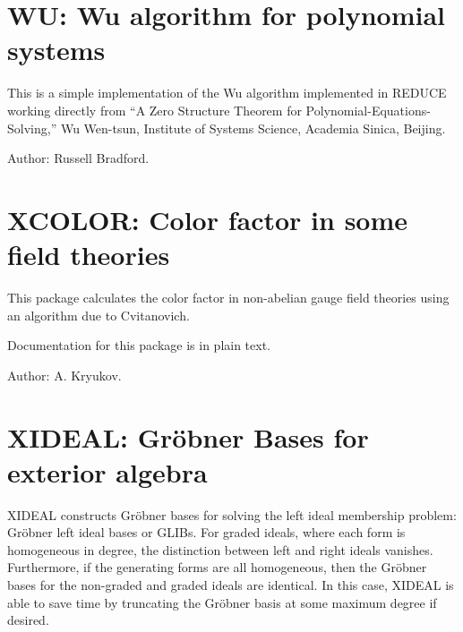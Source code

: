 

\fi
\iffalse
\newpage

\section{TURTLE: Turtle Graphics Interface for REDUCE}

\indexpackage{TURTLE}
Author: Caroline Cotter


\fi

\newpage

\section{WU: Wu algorithm for polynomial systems}

This is a simple implementation of the Wu algorithm implemented in REDUCE
working directly from ``A Zero Structure Theorem for
Polynomial-Equations-Solving,'' Wu Wen-tsun, Institute of Systems Science,
Academia Sinica, Beijing.

Author: Russell Bradford.



\newpage

\section{XCOLOR: Color factor in some field theories}


This package calculates the color factor in non-abelian gauge field
theories using an algorithm due to Cvitanovich.

Documentation for this package is in plain text.

Author: A. Kryukov.



\newpage

\section{XIDEAL: Gr\"obner Bases for exterior algebra}
\label{package:XIDEAL}

XIDEAL constructs Gr\"obner bases for solving the left ideal membership
problem: Gr\"obner left ideal bases or GLIBs. For graded ideals, where each
form is homogeneous in degree, the distinction between left and right
ideals vanishes. Furthermore, if the generating forms are all homogeneous,
then the Gr\"obner bases for the non-graded and graded ideals are
identical. In this case, XIDEAL is able to save time by truncating the
Gr\"obner basis at some maximum degree if desired.


